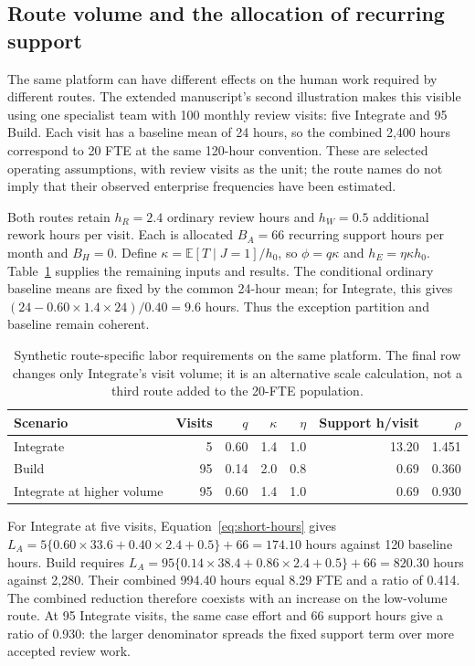 \subsection{Route volume and the allocation of recurring support}
\label{sec:route-scale}

The same platform can have different effects on the human work required by different routes.
The extended manuscript's second illustration makes this visible using one specialist team
with 100 monthly review visits: five Integrate and 95 Build. Each visit has a baseline mean
of 24 hours, so the combined 2,400 hours correspond to 20 FTE at the same 120-hour convention.
These are selected operating assumptions, with review visits as the unit; the route names
do not imply that their observed enterprise frequencies have been estimated.

Both routes retain $h_R=2.4$ ordinary review hours and $h_W=0.5$ additional rework hours per
visit. Each is allocated $B_A=66$ recurring support hours per month and $B_H=0$.
Define $\kappa=\mathbb E[T\mid J=1]/h_0$, so $\phi=q\kappa$ and
$h_E=\eta\kappa h_0$. Table~\ref{tab:route-scale} supplies the remaining inputs and results.
The conditional ordinary baseline means are fixed by the common 24-hour mean; for Integrate,
this gives $(24-0.60\times1.4\times24)/0.40=9.6$ hours. Thus the exception partition and
baseline remain coherent.

\begin{table}[!htb]
\centering\small
\caption{Synthetic route-specific labor requirements on the same platform. The final row
changes only Integrate's visit volume; it is an alternative scale calculation, not a third
route added to the 20-FTE population.}
\label{tab:route-scale}
\begin{tabular}{@{}lrrrrrr@{}}
\toprule
Scenario & Visits & $q$ & $\kappa$ & $\eta$ & Support h/visit & $\rho$\\
\midrule
Integrate & 5 & 0.60 & 1.4 & 1.0 & 13.20 & 1.451\\
Build & 95 & 0.14 & 2.0 & 0.8 & 0.69 & 0.360\\
Integrate at higher volume & 95 & 0.60 & 1.4 & 1.0 & 0.69 & 0.930\\
\bottomrule
\end{tabular}
\end{table}

For Integrate at five visits, Equation~\eqref{eq:short-hours} gives
$L_A=5\{0.60\times33.6+0.40\times2.4+0.5\}+66=174.10$ hours against 120 baseline
hours. Build requires $L_A=95\{0.14\times38.4+0.86\times2.4+0.5\}+66=820.30$ hours
against 2,280. Their combined 994.40 hours equal 8.29 FTE and a ratio of 0.414. The combined
reduction therefore coexists with an increase on the low-volume route. At 95 Integrate visits,
the same case effort and 66 support hours give a ratio of 0.930: the larger denominator spreads
the fixed support term over more accepted review work.

